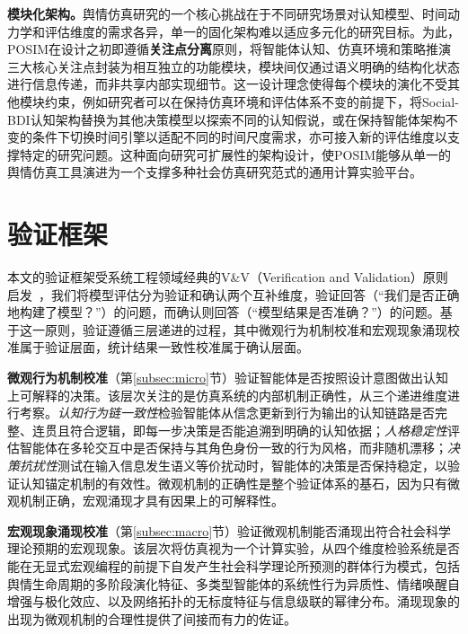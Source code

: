 \documentclass[a4paper,fleqn]{cas-dc}
\begin{document}
\textbf{模块化架构。}舆情仿真研究的一个核心挑战在于不同研究场景对认知模型、时间动力学和评估维度的需求各异，单一的固化架构难以适应多元化的研究目标。为此，POSIM在设计之初即遵循\textbf{关注点分离}原则，将智能体认知、仿真环境和策略推演三大核心关注点封装为相互独立的功能模块，模块间仅通过语义明确的结构化状态进行信息传递，而非共享内部实现细节。这一设计理念使得每个模块的演化不受其他模块约束，例如研究者可以在保持仿真环境和评估体系不变的前提下，将Social-BDI认知架构替换为其他决策模型以探索不同的认知假说，或在保持智能体架构不变的条件下切换时间引擎以适配不同的时间尺度需求，亦可接入新的评估维度以支撑特定的研究问题。这种面向研究可扩展性的架构设计，使POSIM能够从单一的舆情仿真工具演进为一个支撑多种社会仿真研究范式的通用计算实验平台。

\section{验证框架}\label{sec:validation}

本文的验证框架受系统工程领域经典的V\&V（Verification and Validation）原则启发~\citep{sargent_verification_2013}，我们将模型评估分为验证和确认两个互补维度，验证回答（“我们是否正确地构建了模型？”）的问题，而确认则回答（“模型结果是否准确？”）的问题。基于这一原则，验证遵循三层递进的过程，其中微观行为机制校准和宏观现象涌现校准属于验证层面，统计结果一致性校准属于确认层面。

\textbf{微观行为机制校准}（第\ref{subsec:micro}节）验证智能体是否按照设计意图做出认知上可解释的决策。该层次关注的是仿真系统的内部机制正确性，从三个递进维度进行考察。\textit{认知行为链一致性}检验智能体从信念更新到行为输出的认知链路是否完整、连贯且符合逻辑，即每一步决策是否能追溯到明确的认知依据；\textit{人格稳定性}评估智能体在多轮交互中是否保持与其角色身份一致的行为风格，而非随机漂移；\textit{决策抗扰性}测试在输入信息发生语义等价扰动时，智能体的决策是否保持稳定，以验证认知锚定机制的有效性。微观机制的正确性是整个验证体系的基石，因为只有微观机制正确，宏观涌现才具有因果上的可解释性。

\textbf{宏观现象涌现校准}（第\ref{subsec:macro}节）验证微观机制能否涌现出符合社会科学理论预期的宏观现象。该层次将仿真视为一个计算实验，从四个维度检验系统是否能在无显式宏观编程的前提下自发产生社会科学理论所预测的群体行为模式，包括舆情生命周期的多阶段演化特征、多类型智能体的系统性行为异质性、情绪唤醒自增强与极化效应、以及网络拓扑的无标度特征与信息级联的幂律分布。涌现现象的出现为微观机制的合理性提供了间接而有力的佐证。
\end{document}
